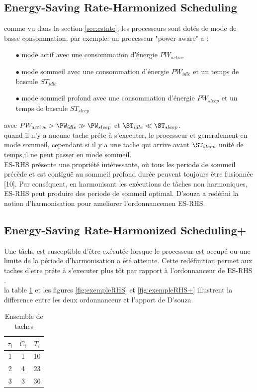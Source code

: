 \subsection{Energy-Saving Rate-Harmonized Scheduling}
comme vu dans la section \ref{sec:cstate}, les processeurs sont dotés de mode de basse consommation.
par exemple: un processeur "power-aware" a :
\vspace{0.5cm}
\begin{itemize}
\item[$\bullet$] mode actif avec une consommation d'énergie $PW_{active}$
\item[$\bullet$] mode sommeil avec une consommation d'énergie $PW_{idle}$ et un temps de bascule $ST_{idle}$
\item[$\bullet$] mode sommeil profond avec une consommation d'énergie $PW_{sleep}$ et un temps de bascule $ST_{sleep}$
\end{itemize}
\vspace{0.5cm}
avec $PW_{active} > \PW_{idle} \gg \PW_{sleep} $ et $ \ST_{idle} \ll \ST_{sleep}$.
\\ \indent quand il n'y a aucune tache préte à s'executer, le processeur et generalement en mode sommeil, cependant si il  y a une tache qui arrive avant $\ST_{sleep}$ unité de temps,il ne peut passer en mode sommeil.
\\ \indent ES-RHS présente une propriété intéressante, où tous les periode de sommeil précède et est contiguë au sommeil profond durée peuvent toujours être fusionnée [10]. Par conséquent, en harmonisant
les exécutions de tâches non harmoniques, ES-RHS peut produire des periode de sommeil optimal. D'souza \cite{DAR16} a redéfini la notion d'harmonisation pour ameliorer l'ordonnancemen ES-RHS.
\subsection{Energy-Saving Rate-Harmonized Scheduling+}
\indent Une tâche est susceptible d'être exécutée lorsque le processeur est occupé ou une limite de la période d'harmonisation a été atteinte. Cette redéfinition permet aux taches d'etre préte à s'executer plus tôt par rapport à l'ordonnanceur de ES-RHS \cite{Rowe10}.
\\ la table \ref{tab:exempleRHS} et les figures \ref{fig:exempleRHS} et \ref{fig:exempleRHS+} illustrent la difference entre les deux ordonnanceur et l'apport de D'souza.

\begin{table}[h]
\begin{center}
\begin{tabular}{|c|c|c|}
 \hline$\tau_i$ & $C_i$ & $T_i$ \\ 
 \hline1 & 1 & 10 \\ 
 \hline 2 & 4 & 23 \\ 
 \hline 3 & 3 & 36 \\ 
 \hline 
 \end{tabular}
\end{center}
\caption{Ensemble de taches} \label{tab:exempleRHS}
\end{table}

